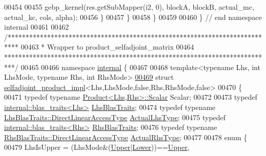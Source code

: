 \begin{DoxyCode}
00454 
00455         gebp\_kernel(res.getSubMapper(i2, 0), blockA, blockB, actual\_mc, actual\_kc, cols, alpha);
00456       \}
00457     \}
00458   \}
00459 
00460 \} \textcolor{comment}{// end namespace internal}
00461 
00462 \textcolor{comment}{/***************************************************************************}
00463 \textcolor{comment}{* Wrapper to product\_selfadjoint\_matrix}
00464 \textcolor{comment}{***************************************************************************/}
00465 
00466 \textcolor{keyword}{namespace }\hyperlink{namespaceinternal}{internal} \{
00467   
00468 \textcolor{keyword}{template}<\textcolor{keyword}{typename} Lhs, \textcolor{keywordtype}{int} LhsMode, \textcolor{keyword}{typename} Rhs, \textcolor{keywordtype}{int} RhsMode>
\hyperlink{struct_eigen_1_1internal_1_1selfadjoint__product__impl_3_01_lhs_00_01_lhs_mode_00_01false_00_01_0e7941e7b3bc2131c413f23ec856f76c}{00469} \textcolor{keyword}{struct }\hyperlink{struct_eigen_1_1internal_1_1selfadjoint__product__impl}{selfadjoint\_product\_impl}<Lhs,LhsMode,false,Rhs,RhsMode,false>
00470 \{
00471   \textcolor{keyword}{typedef} \textcolor{keyword}{typename} \hyperlink{group___core___module_class_eigen_1_1_product}{Product<Lhs,Rhs>::Scalar} Scalar;
00472   
00473   \textcolor{keyword}{typedef} \hyperlink{struct_eigen_1_1internal_1_1blas__traits}{internal::blas\_traits<Lhs>} \hyperlink{struct_eigen_1_1internal_1_1blas__traits}{LhsBlasTraits};
00474   \textcolor{keyword}{typedef} \textcolor{keyword}{typename} \hyperlink{class_eigen_1_1internal_1_1_tensor_lazy_evaluator_writable}{LhsBlasTraits::DirectLinearAccessType} 
      \hyperlink{class_eigen_1_1internal_1_1_tensor_lazy_evaluator_writable}{ActualLhsType};
00475   \textcolor{keyword}{typedef} \hyperlink{struct_eigen_1_1internal_1_1blas__traits}{internal::blas\_traits<Rhs>} \hyperlink{struct_eigen_1_1internal_1_1blas__traits}{RhsBlasTraits};
00476   \textcolor{keyword}{typedef} \textcolor{keyword}{typename} \hyperlink{class_eigen_1_1internal_1_1_tensor_lazy_evaluator_writable}{RhsBlasTraits::DirectLinearAccessType} 
      \hyperlink{class_eigen_1_1internal_1_1_tensor_lazy_evaluator_writable}{ActualRhsType};
00477   
00478   \textcolor{keyword}{enum} \{
00479     LhsIsUpper = (LhsMode&(\hyperlink{group__enums_gga39e3366ff5554d731e7dc8bb642f83cda6bcb58be3b8b8ec84859ce0c5ac0aaec}{Upper}|\hyperlink{group__enums_gga39e3366ff5554d731e7dc8bb642f83cda891792b8ed394f7607ab16dd716f60e6}{Lower}))==\hyperlink{group__enums_gga39e3366ff5554d731e7dc8bb642f83cda6bcb58be3b8b8ec84859ce0c5ac0aaec}{Upper},

\end{DoxyCode}
